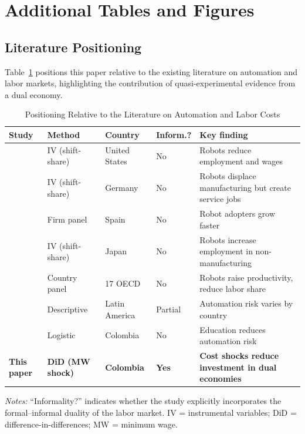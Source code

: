 \documentclass[5p,times,authoryear]{elsarticle}
\begin{document}
\appendix

\section{Additional Tables and Figures}
\label{app:tables}

\subsection{Literature Positioning}
\label{app:literature}

Table~\ref{tab:literature} positions this paper relative to the existing literature on automation and labor markets, highlighting the contribution of quasi-experimental evidence from a dual economy.

\begin{table}[htbp]
\centering
\begin{threeparttable}
\caption{Positioning Relative to the Literature on Automation and Labor Costs}
\label{tab:literature}
\footnotesize
\setlength{\tabcolsep}{4pt}
\begin{tabular}{@{}p{2.5cm}p{1.8cm}p{2.0cm}p{1.3cm}p{3.5cm}@{}}
\toprule
Study & Method & Country & Inform.? & Key finding \\
\midrule
\citet{acemoglu2020robots} & IV (shift-share) & United States & No & Robots reduce employment and wages \\
\citet{dauth2021} & IV (shift-share) & Germany & No & Robots displace manufacturing but create service jobs \\
\citet{koch2021} & Firm panel & Spain & No & Robot adopters grow faster \\
\citet{adachi2022} & IV (shift-share) & Japan & No & Robots increase employment in non-manufacturing \\
\citet{graetz2018} & Country panel & 17 OECD & No & Robots raise productivity, reduce labor share \\
\citet{bid2023} & Descriptive & Latin America & Partial & Automation risk varies by country \\
\citet{morales2023risk} & Logistic & Colombia & No & Education reduces automation risk \\
\textbf{This paper} & \textbf{DiD (MW shock)} & \textbf{Colombia} & \textbf{Yes} & \textbf{Cost shocks reduce investment in dual economies} \\
\bottomrule
\end{tabular}
\begin{tablenotes}
\footnotesize
\item \textit{Notes:} ``Informality?'' indicates whether the study explicitly incorporates the formal--informal duality of the labor market. IV = instrumental variables; DiD = difference-in-differences; MW = minimum wage.
\end{tablenotes}
\end{threeparttable}
\end{table}
\end{document}
